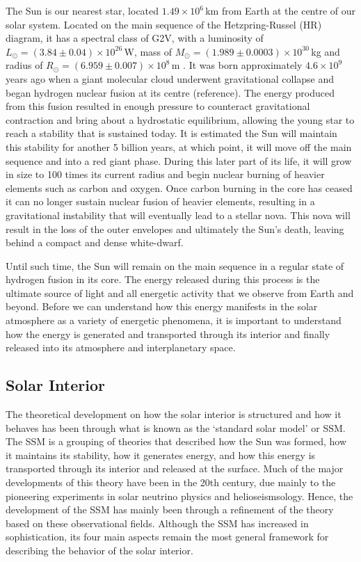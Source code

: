 The Sun is our nearest star, located $1.49\times10^6$\,km from Earth at the centre of our solar system. Located on the main sequence of the Hetzpring-Russel (HR) diagram, it has a spectral class of G2V, with a luminosity of $L_{\odot}=(3.84\pm 0.04)\times10^{26}$\,W, mass of $M_{\odot}=(1.989\pm0.0003)\times10^{30}$\,kg and radius of $R_{\odot}=(6.959\pm0.007)\times10^8$\,m \citep{foukal2004}. It was born approximately $4.6 \times 10^9$\,years ago when a giant molecular cloud underwent gravitational collapse and began hydrogen nuclear fusion at its centre (reference). The energy produced from this fusion resulted in enough pressure to counteract gravitational contraction and bring about a hydrostatic equilibrium, allowing the young star to reach a stability that is sustained today. It is estimated the Sun will maintain this stability for another 5 billion years, at which point, it will move off the main sequence and into a red giant phase. During this later part of its life, it will grow in size to 100 times its current radius and begin nuclear burning of heavier elements such as carbon and oxygen. Once carbon burning in the core has ceased it can no longer sustain nuclear fusion of heavier elements, resulting in a gravitational instability that will eventually lead to a stellar nova. This nova will result in the loss of the outer envelopes and ultimately the Sun's death, leaving behind a compact and dense white-dwarf.

Until such time, the Sun will remain on the main sequence in a regular state of hydrogen fusion in its core. The energy released during this process is the ultimate source of light and all energetic activity that we observe from Earth and beyond. Before we can understand how this energy manifests in the solar atmosphere as a variety of energetic phenomena, it is important to understand how the energy is generated and transported through its interior and finally released into its atmosphere and interplanetary space.

\subsection{Solar Interior}\label{sec:10}

The theoretical development on how the solar interior is structured and how it behaves has been through what is known as the \textquoteleft standard solar model' or SSM. The SSM is a grouping of theories that described how the Sun was formed, how it maintains its stability, how it generates energy, and how this energy is transported through its interior and released at the surface. Much of the major developments of this theory have been in the 20th century, due mainly to the pioneering experiments in solar neutrino physics and helioseismsology. Hence, the development of the SSM has mainly been through a refinement of the theory based on these observational fields. Although the SSM has increased in sophistication, its four main aspects remain the most general framework for describing the behavior of the solar interior.

